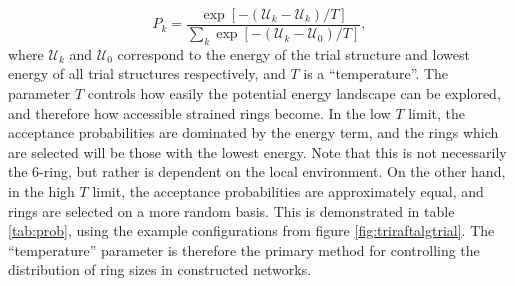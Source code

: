 \begin{equation}
	\label{eq:probdist}
	P_k=\frac{ \exp{\left[-\left(\mathcal{U}_{k}-\mathcal{U}_k\right)/T\right]}}{\sum\limits_{k}\exp{\left[-\left(\mathcal{U}_{k}-\mathcal{U}_{0}\right)/T\right]}},
\end{equation}
where $\mathcal{U}_k$ and $\mathcal{U}_{0}$ correspond to the energy of the trial structure and lowest energy of all trial structures respectively, and $T$ is a ``temperature''. 
The parameter $T$ controls how easily the potential energy landscape can be explored, and therefore how accessible strained rings become. 
In the low $T$ limit, the acceptance probabilities are dominated by the energy term, and the rings which are selected will be those with the lowest energy. 
Note that this is not necessarily the 6-ring, but rather is dependent on the local environment. On the other hand, in the high $T$ limit, the acceptance probabilities are approximately equal, and rings are selected on a more random basis. 
This is demonstrated in table \ref{tab:prob}, using the example configurations from figure \ref{fig:triraftalgtrial}. 
The ``temperature'' parameter is therefore the primary method for controlling the distribution of ring sizes in constructed networks.

